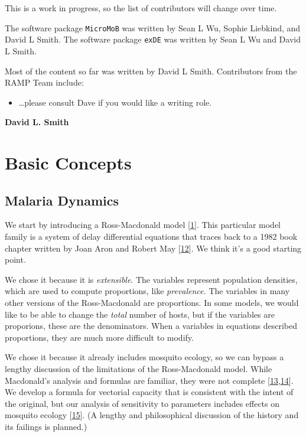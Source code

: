 \documentclass[
]{book}
\providecommand{\tightlist}{%
  \setlength{\itemsep}{0pt}\setlength{\parskip}{0pt}}
\begin{document}
This is a work in progress, so the list of contributors will change over time.

The software package \texttt{MicroMoB} was written by Sean L Wu, Sophie Liebkind, and David L Smith. The software package \texttt{exDE} was written by Sean L Wu and David L Smith.

Most of the content so far was written by David L Smith. Contributors from the RAMP Team include:

\begin{itemize}
\tightlist
\item
  \ldots please consult Dave if you would like a writing role.
\end{itemize}

\textbf{David L. Smith}

\hypertarget{part-basic-concepts}{%
\part{Basic Concepts}\label{part-basic-concepts}}

\hypertarget{malaria-dynamics}{%
\chapter{Malaria Dynamics}\label{malaria-dynamics}}

We start by introducing a Ross-Macdonald model {[}\protect\hyperlink{ref-SmithDL2012_RossMacdonald}{1}{]}. This particular model family is a system of delay differential equations that traces back to a 1982 book chapter written by Joan Aron and Robert May {[}\protect\hyperlink{ref-AronJL1982PopulationDynamics}{12}{]}. We think it's a good starting point.

We chose it because it is \emph{extensible}. The variables represent population densities, which are used to compute proportions, like \emph{prevalence.} The variables in many other versions of the Ross-Macdonald are proportions. In some models, we would like to be able to change the \emph{total} number of hosts, but if the variables are proporions, these are the denominators. When a variables in equations described proportions, they are much more difficult to modify.

We chose it because it already includes mosquito ecology, so we can bypass a lengthy discussion of the limitations of the Ross-Macdonald model. While Macdonald's analysis and formulas are familiar, they were not complete {[}\protect\hyperlink{ref-SmithDL2004_Statics}{13},\protect\hyperlink{ref-SmithDL2021_NewTestOldMosquitoes}{14}{]}. We develop a formula for vectorial capacity that is consistent with the intent of the original, but our analysis of sensitivity to parameters includes effects on mosquito ecology {[}\protect\hyperlink{ref-BradyOJ2015AdultVector}{15}{]}. (A lengthy and philosophical discussion of the history and its failings is planned.)
\end{document}
